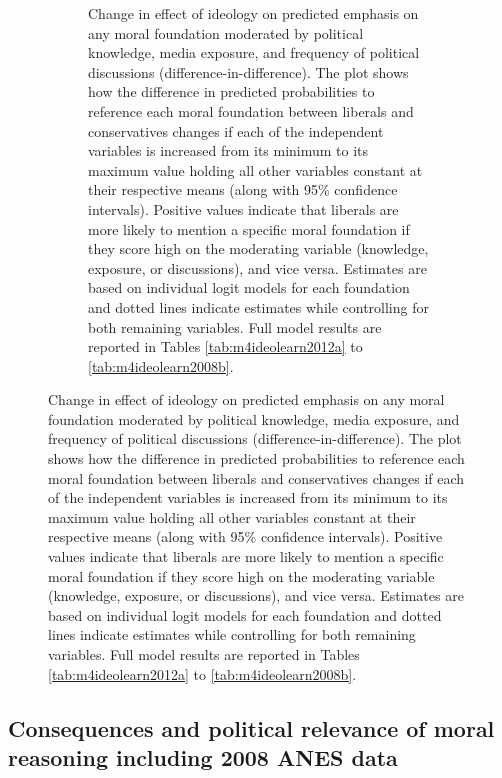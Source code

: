 \documentclass[12pt]{article}
\begin{document}
\begin{figure}[h]
\begin{subfigure}[t]{0.49\textwidth}
    \caption{Change in effect of ideology on predicted emphasis on any moral foundation moderated by political knowledge, media exposure, and frequency of political discussions (difference-in-difference). The plot shows how the difference in predicted probabilities to reference each moral foundation between liberals and conservatives changes if each of the independent variables is increased from its minimum to its maximum value holding all other variables constant at their respective means (along with 95\% confidence intervals). Positive values indicate that liberals are more likely to mention a specific moral foundation if they score high on the moderating variable (knowledge, exposure, or discussions), and vice versa. Estimates are based on individual logit models for each foundation and dotted lines indicate estimates while controlling for both remaining variables. Full model results are reported in Tables \ref{tab:m4ideolearn2012a} to \ref{tab:m4ideolearn2008b}.}\label{fig:appD8ideolearn}
  \end{subfigure}
\end{figure}


\clearpage
\subsection{Consequences and political relevance of moral reasoning including 2008 ANES data}
\end{document}
